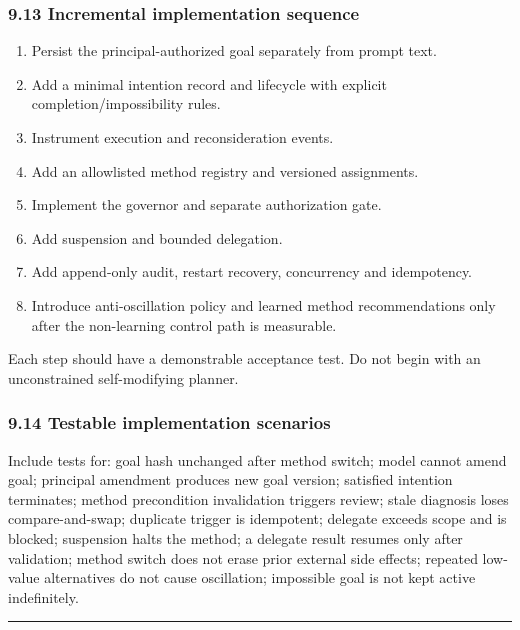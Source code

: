 \subsubsection{9.13 Incremental implementation sequence}\label{incremental-implementation-sequence}

\begin{enumerate}
\def\labelenumi{\arabic{enumi}.}
\tightlist
\item
  Persist the principal-authorized goal separately from prompt text.
\item
  Add a minimal intention record and lifecycle with explicit completion/impossibility rules.
\item
  Instrument execution and reconsideration events.
\item
  Add an allowlisted method registry and versioned assignments.
\item
  Implement the governor and separate authorization gate.
\item
  Add suspension and bounded delegation.
\item
  Add append-only audit, restart recovery, concurrency and idempotency.
\item
  Introduce anti-oscillation policy and learned method recommendations only after the non-learning control path is measurable.
\end{enumerate}

Each step should have a demonstrable acceptance test. Do not begin with an unconstrained self-modifying planner.

\subsubsection{9.14 Testable implementation scenarios}\label{testable-implementation-scenarios}

Include tests for: goal hash unchanged after method switch; model cannot amend goal; principal amendment produces new goal version; satisfied intention terminates; method precondition invalidation triggers review; stale diagnosis loses compare-and-swap; duplicate trigger is idempotent; delegate exceeds scope and is blocked; suspension halts the method; a delegate result resumes only after validation; method switch does not erase prior external side effects; repeated low-value alternatives do not cause oscillation; impossible goal is not kept active indefinitely.

\begin{center}\rule{0.5\linewidth}{0.5pt}\end{center}

